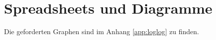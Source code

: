 \section{Spreadsheets und Diagramme}
Die geforderten Graphen sind im Anhang \ref{app:loglog} zu finden.

